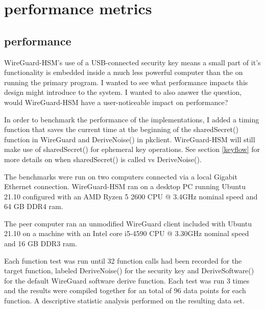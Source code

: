 \documentclass [11pt, proquest] {uwthesis}[2020/02/24]
\begin{document}
\section{performance metrics}

\subsection{performance}
WireGuard-HSM's use of a USB-connected security key means a small part of it's functionality is embedded inside a much less powerful computer than the on running the primary program. I wanted to see what performance impacts this design might introduce to the system. I wanted to also answer the question, would WireGuard-HSM have a user-noticeable impact on performance?

In order to benchmark the performance of the implementations, I added a timing function that saves the current time at the beginning of the sharedSecret() function in WireGuard and DeriveNoise() in pkclient. WireGuard-HSM will still make use of sharedSecret() for ephemeral key operations.
See section \ref{keyflow} for more details on when sharedSecret() is called vs DeriveNoise().

The benchmarks were run on two computers connected via a local Gigabit Ethernet connection. 
WireGuard-HSM ran on a desktop PC running Ubuntu 21.10 configured with an AMD Ryzen 5 2600 CPU @ 3.4GHz nominal speed and 64 GB DDR4 ram. 

The peer computer ran an unmodified WireGuard client included with Ubuntu 21.10 on a machine with an Intel core i5-4590 CPU @ 3.30GHz nominal speed and 16 GB DDR3 ram.  

Each function test was run until 32 function calls had been recorded for the target function, labeled DeriveNoise() for the security key and DeriveSoftware() for the default WireGuard software derive function.
Each test was run 3 times and the results were compiled together for an total of 96 data points for each function. A descriptive statistic analysis performed on the resulting data set.
\end{document}
